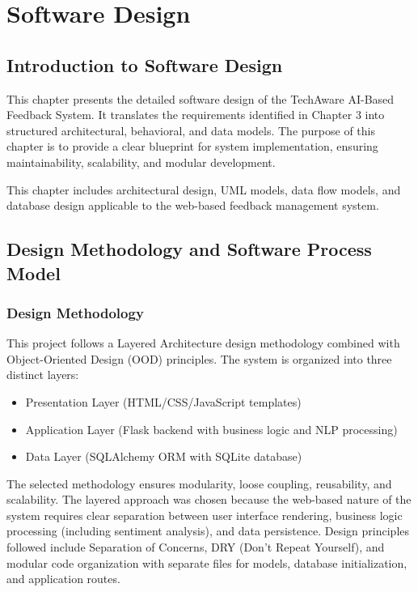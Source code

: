\chapter{Software Design}

\section{Introduction to Software Design}

This chapter presents the detailed software design of the TechAware AI-Based Feedback System. It translates the requirements identified in Chapter 3 into structured architectural, behavioral, and data models. The purpose of this chapter is to provide a clear blueprint for system implementation, ensuring maintainability, scalability, and modular development.

This chapter includes architectural design, UML models, data flow models, and database design applicable to the web-based feedback management system.

\section{Design Methodology and Software Process Model}

\subsection{Design Methodology}

This project follows a Layered Architecture design methodology combined with Object-Oriented Design (OOD) principles. The system is organized into three distinct layers:

\begin{itemize}
    \item Presentation Layer (HTML/CSS/JavaScript templates)
    \item Application Layer (Flask backend with business logic and NLP processing)
    \item Data Layer (SQLAlchemy ORM with SQLite database)
\end{itemize}

The selected methodology ensures modularity, loose coupling, reusability, and scalability. The layered approach was chosen because the web-based nature of the system requires clear separation between user interface rendering, business logic processing (including sentiment analysis), and data persistence. Design principles followed include Separation of Concerns, DRY (Don't Repeat Yourself), and modular code organization with separate files for models, database initialization, and application routes.

